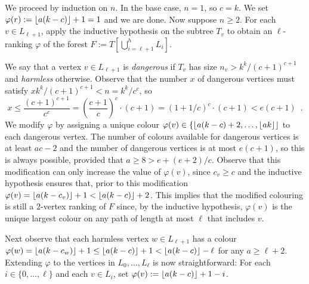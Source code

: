 \documentclass[kpfonts]{patmorin}
\newcommand{\defin}[1]{\emph{\color{brightmaroon}#1}}
\theoremstyle{named}
\begin{document}
We proceed by induction on $n$. In the base case, $n=1$, so $c=k$.  We set $\varphi(r):={\lfloor a(k-c) \rfloor}+1=1$ and we are done. Now suppose $n\ge 2$.  For each $v\in L_{\ell+1}$, apply the inductive hypothesis on the subtree $T_v$ to obtain an $\ell$-ranking $\varphi$ of the forest $F:=T[\bigcup_{i=\ell+1}^h L_i]$.

We say that a vertex $v\in L_{\ell+1}$ is \defin{dangerous} if $T_v$ has size $n_v> k^k/(c+1)^{c+1}$ and \defin{harmless} otherwise.  Observe that the number $x$ of dangerous vertices must satisfy $xk^k/(c+1)^{c+1} < n = k^k/c^c$, so
\[
  x \le \frac{(c+1)^{c+1}}{c^c} = \left(\frac{c+1}{c}\right)^c\cdot(c+1)
  = (1+1/c)^c\cdot (c+1) < e(c+1) \enspace .
\]
We modify $\varphi$ by assigning a unique colour $\varphi(v)\in\{{\lfloor a(k-c)+2,\ldots,{\lfloor ak \rfloor} \rfloor}$ to each dangerous vertex.  The number of colours available for dangerous vertices is at least $ac-2$ and the number of dangerous vertices is at most $e(c+1)$, so this is always possible, provided that
$a \ge 8 > e + (e+2)/c$.  Observe that this modification can only increase the value of $\varphi(v)$, since $c_v \ge c$ and the inductive hypothesis ensures that, prior to this modification $\varphi(v)={\lfloor a(k-c_v) \rfloor}+1 < {\lfloor a(k-c) \rfloor}+2$.  This implies that the modified colouring is still a $2$-vertex ranking of $F$ since, by the inductive hypothesis, $\varphi(v)$ is the unique largest colour on any path of length at most $\ell$ that includes $v$.

Next observe that each harmless vertex $w\in L_{\ell+1}$ has a colour $\varphi(w) = {\lfloor a(k-c_w) \rfloor}+1 \le {\lfloor a(k-c) \rfloor}+1 < {\lfloor a(k-c) \rfloor}-\ell$ for any $a\ge \ell+2$. Extending $\varphi$ to the vertices in $L_0,\ldots,L_{\ell}$ is now straightforward:  For each $i\in\{0,\ldots,\ell\}$ and each $v\in L_i$, set $\varphi(v):={\lfloor a(k-c) \rfloor}+1-i$.
\end{document}
